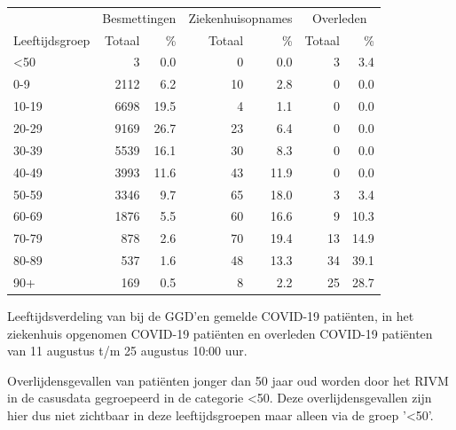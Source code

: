 \documentclass[
  english,
  man,floatsintext]{apa6}
\begin{document}
\begin{table}
\centering\begingroup\fontsize{11}{13}\selectfont

\begin{threeparttable}
\begin{tabular}{lrrrrrr}
\toprule
\multicolumn{1}{c}{ } & \multicolumn{2}{c}{Besmettingen} & \multicolumn{2}{c}{Ziekenhuisopnames} & \multicolumn{2}{c}{Overleden} \\
\cmidrule(l{3pt}r{3pt}){2-3} \cmidrule(l{3pt}r{3pt}){4-5} \cmidrule(l{3pt}r{3pt}){6-7}
Leeftijdsgroep & Totaal & \% & Totaal & \% & Totaal & \%\\
\midrule
<50 & 3 & 0.0 & 0 & 0.0 & 3 & 3.4\\
0-9 & 2112 & 6.2 & 10 & 2.8 & 0 & 0.0\\
10-19 & 6698 & 19.5 & 4 & 1.1 & 0 & 0.0\\
20-29 & 9169 & 26.7 & 23 & 6.4 & 0 & 0.0\\
30-39 & 5539 & 16.1 & 30 & 8.3 & 0 & 0.0\\
40-49 & 3993 & 11.6 & 43 & 11.9 & 0 & 0.0\\
50-59 & 3346 & 9.7 & 65 & 18.0 & 3 & 3.4\\
60-69 & 1876 & 5.5 & 60 & 16.6 & 9 & 10.3\\
70-79 & 878 & 2.6 & 70 & 19.4 & 13 & 14.9\\
80-89 & 537 & 1.6 & 48 & 13.3 & 34 & 39.1\\
90+ & 169 & 0.5 & 8 & 2.2 & 25 & 28.7\\
\bottomrule
\end{tabular}
\begin{tablenotes}
\item[1] Leeftijdsverdeling van bij de GGD’en gemelde COVID-19 patiënten, in het ziekenhuis opgenomen COVID-19 patiënten en overleden COVID-19 patiënten van 11 augustus t/m 25 augustus 10:00 uur.
\item[2] Overlijdensgevallen van patiënten jonger dan 50 jaar oud worden door het RIVM in de casusdata gegroepeerd in de categorie <50. Deze overlijdensgevallen zijn hier dus niet zichtbaar in deze leeftijdsgroepen maar alleen via de groep '<50'.
\end{tablenotes}
\end{threeparttable}
\endgroup{}
\end{table}

\newpage
\end{document}
